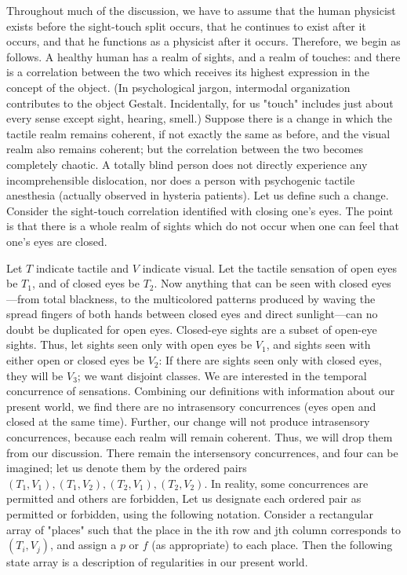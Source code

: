 Throughout much of the discussion, we have to assume that the human 
physicist exists before the sight-touch split occurs, that he continues to exist 
after it occurs, and that he functions as a physicist after it occurs. Therefore, 
we begin as follows. A healthy human has a realm of sights, and a realm of 
touches: and there is a correlation between the two which receives its highest 
expression in the concept of the object. (In psychological jargon, intermodal 
organization contributes to the object Gestalt. Incidentally, for us "touch" 
includes just about every sense except sight, hearing, smell.) Suppose there is 
a change in which the tactile realm remains coherent, if not exactly the same 
as before, and the visual realm also remains coherent; but the correlation 
between the two becomes completely chaotic. A totally blind person does 
not directly experience any incomprehensible dislocation, nor does a person 
with psychogenic tactile anesthesia (actually observed in hysteria patients). 
Let us define such a change. Consider the sight-touch correlation identified 
with closing one's eyes. The point is that there is a whole realm of sights 
which do not occur when one can feel that one's eyes are closed. 

Let $T$ indicate tactile and $V$ indicate visual. Let the tactile sensation of 
open eyes be $T_1$, and of closed eyes be $T_2$. Now anything that can be seen 
with closed eyes---from total blackness, to the multicolored patterns produced 
by waving the spread fingers of both hands between closed eyes and direct 
sunlight---can no doubt be duplicated for open eyes. Closed-eye sights are a 
subset of open-eye sights. Thus, let sights seen only with open eyes be $V_1$, 
and sights seen with either open or closed eyes be $V_2$: If there are sights seen 
only with closed eyes, they will be $V_3$; we want disjoint classes. We are 
interested in the temporal concurrence of sensations. Combining our 
definitions with information about our present world, we find there are no 
intrasensory concurrences (eyes open and closed at the same time). Further, 
our change will not produce intrasensory concurrences, because each realm 
will remain coherent. Thus, we will drop them from our discussion. There 
remain the intersensory concurrences, and four can be imagined; let us 
denote them by the ordered pairs $(T_1, V_1), (T_1, V_2), (T_2, V_1), (T_2, V_2)$. In 
reality, some concurrences are permitted and others are forbidden, Let us 
designate each ordered pair as permitted or forbidden, using the following 
notation. Consider a rectangular array of "places" such that the place in the 
ith row and jth column corresponds to $(T_i, V_j)$, and assign a $p$ or $f$ (as 
appropriate) to each place. Then the following state array is a description of 
regularities in our present world. 

